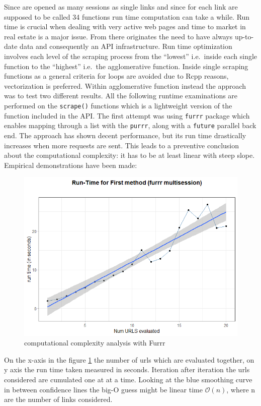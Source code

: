 \documentclass[
  12pt,
  a4paper,
  oneside]{book}
\theoremstyle{definition}
\theoremstyle{definition}
\theoremstyle{definition}
\theoremstyle{remark}
\begin{document}
Since are opened as many sessions as single links and since for each link are supposed to be called 34 functions run time computation can take a while. Run time is crucial when dealing with very active web pages and time to market in real estate is a major issue. From there originates the need to have always up-to-date data and consequently an API infrastructure. Run time optimization involves each level of the scraping process from the ``lowest'' i.e.~inside each single function to the ``highest'' i.e.~the agglomerative function. Inside single scraping functions as a general criteria for loops are avoided due to Rcpp reasons, vectorization is preferred. Within agglomerative function instead the approach was to test two different results. All the following runtime examinations are performed on the \texttt{scrape()} functions which is a lightweight version of the function included in the API.
The first attempt was using \texttt{furrr} package \citep{furrr} which enables mapping through a list with the \texttt{purrr}, along with a \texttt{future} parallel back end. The approach has shown decent performance, but its run time drastically increases when more requests are sent. This leads to a preventive conclusion about the computational complexity: it has to be at least linear with steep slope. Empirical demonstrations have been made:

\begin{figure}
\centering
\includegraphics{images/run_timefurrr.png}
\caption{\label{fig:furrr}computational complexity analysis with Furrr}
\end{figure}

On the x-axis in the figure \ref{fig:furrr} the number of urls which are evaluated together, on y axis the run time taken measured in seconds. Iteration after iteration the urls considered are cumulated one at at a time. Looking at the blue smoothing curve in between confidence lines the big-O guess might be linear time \(\mathcal{O}(n)\), where n are the number of links considered.
\end{document}
